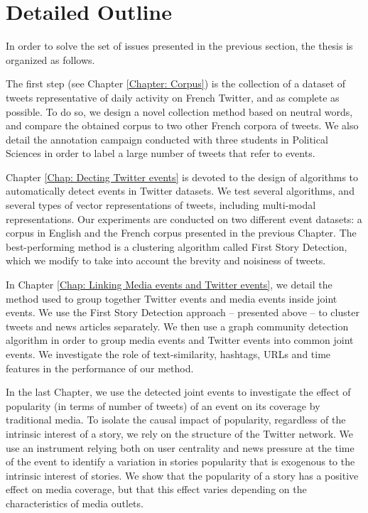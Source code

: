 \section{Detailed Outline}
In order to solve the set of issues presented in the previous section, the thesis is organized as follows.

The first step (see Chapter \ref{Chapter: Corpus}) is the collection of a dataset of tweets representative of daily activity on French Twitter, and as complete as possible. To do so, we design a novel collection method based on neutral words, and compare the obtained corpus to two other French corpora 
of tweets. We also detail the annotation campaign conducted with three students in Political Sciences in order to label a large number of tweets that refer to events.

Chapter \ref{Chap: Decting Twitter events} is devoted to the design of algorithms to automatically detect events in Twitter datasets. We test several algorithms, and several types of vector representations of tweets, including multi-modal representations. Our experiments are conducted on two different event datasets: a corpus in English \citep{mcminn_building_2013} and the French corpus presented in the previous Chapter. The best-performing method is a clustering algorithm called First Story Detection, which we modify to take into account the brevity and noisiness of tweets.

In Chapter \ref{Chap: Linking Media events and Twitter events}, we detail the method used to group together Twitter events and media events inside joint events. We use the First Story Detection approach -- presented above -- to cluster tweets and news articles separately. We then use a graph community detection algorithm in order to group media events and Twitter events into common joint events. We investigate the role of text-similarity, hashtags, URLs and time features in the performance of our method.

In the last Chapter, we use the detected joint events to investigate the effect of popularity (in terms of number of tweets) of an event on its coverage by traditional media. To isolate the causal impact of popularity, regardless of the intrinsic interest of a story, we rely on the structure of the Twitter network. We use an instrument relying both on user centrality and news pressure at the time of the event to identify a variation in stories popularity that is exogenous to the intrinsic interest of stories. We show that the popularity of a story has a positive effect on media coverage, but that this effect varies
depending on the characteristics of media outlets.